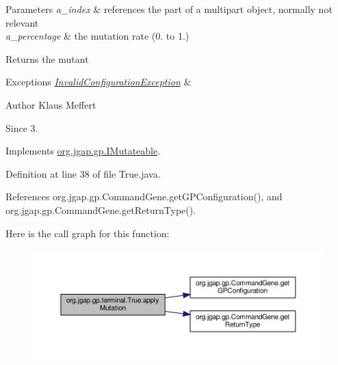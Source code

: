 \begin{DoxyParams}{Parameters}
{\em a\-\_\-index} & references the part of a multipart object, normally not relevant \\
\hline
{\em a\-\_\-percentage} & the mutation rate (0. to 1.) \\
\hline
\end{DoxyParams}
\begin{DoxyReturn}{Returns}
the mutant 
\end{DoxyReturn}

\begin{DoxyExceptions}{Exceptions}
{\em \hyperlink{classorg_1_1jgap_1_1_invalid_configuration_exception}{Invalid\-Configuration\-Exception}} & \\
\hline
\end{DoxyExceptions}
\begin{DoxyAuthor}{Author}
Klaus Meffert 
\end{DoxyAuthor}
\begin{DoxySince}{Since}
3. 
\end{DoxySince}


Implements \hyperlink{interfaceorg_1_1jgap_1_1gp_1_1_i_mutateable_abe553182ae983c2092495c889eecb2e2}{org.\-jgap.\-gp.\-I\-Mutateable}.



Definition at line 38 of file True.\-java.



References org.\-jgap.\-gp.\-Command\-Gene.\-get\-G\-P\-Configuration(), and org.\-jgap.\-gp.\-Command\-Gene.\-get\-Return\-Type().



Here is the call graph for this function\-:
\nopagebreak
\begin{figure}[H]
\begin{center}
\leavevmode
\includegraphics[width=350pt]{classorg_1_1jgap_1_1gp_1_1terminal_1_1_true_a916567d5d3517322184070c9fa468c34_cgraph}
\end{center}
\end{figure}


